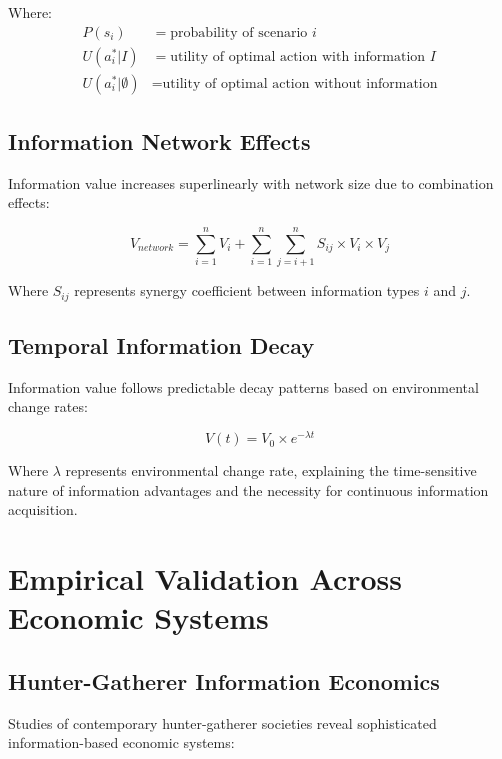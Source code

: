 \documentclass[12pt,a4paper]{article}
\begin{document}
Where:
\begin{align}
P(s_i) &= \text{probability of scenario } i \\
U(a^*_i | I) &= \text{utility of optimal action with information } I \\
U(a^*_i | \emptyset) &= \text{utility of optimal action without information}
\end{align}

\subsection{Information Network Effects}

Information value increases superlinearly with network size due to combination effects:

\begin{equation}
V_{network} = \sum_{i=1}^{n} V_i + \sum_{i=1}^{n} \sum_{j=i+1}^{n} S_{ij} \times V_i \times V_j
\end{equation}

Where $S_{ij}$ represents synergy coefficient between information types $i$ and $j$.

\subsection{Temporal Information Decay}

Information value follows predictable decay patterns based on environmental change rates:

\begin{equation}
V(t) = V_0 \times e^{-\lambda t}
\end{equation}

Where $\lambda$ represents environmental change rate, explaining the time-sensitive nature of information advantages and the necessity for continuous information acquisition.

\section{Empirical Validation Across Economic Systems}

\subsection{Hunter-Gatherer Information Economics}

Studies of contemporary hunter-gatherer societies reveal sophisticated information-based economic systems:
\end{document}
